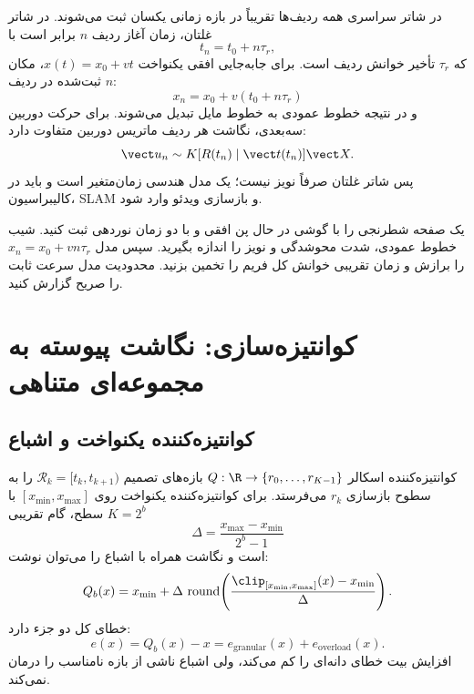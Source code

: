در شاتر سراسری همه ردیف‌ها تقریباً در بازه زمانی یکسان ثبت می‌شوند. در شاتر غلتان، زمان آغاز
ردیف \(n\) برابر است با
\begin{equation}
t_n=t_0+n\tau_r,
\end{equation}
که \(\tau_r\) تأخیر خوانش ردیف است. برای جابه‌جایی افقی یکنواخت \(x(t)=x_0+vt\)، مکان ثبت‌شده
در ردیف \(n\):
\begin{equation}
x_n=x_0+v(t_0+n\tau_r)
\end{equation}
و در نتیجه خطوط عمودی به خطوط مایل تبدیل می‌شوند. برای حرکت دوربین سه‌بعدی، نگاشت هر ردیف
ماتریس دوربین متفاوت دارد:
\begin{equation}
\vect u_n\sim K[R(t_n)\mid\vect t(t_n)]\vect X.
\end{equation}
پس شاتر غلتان صرفاً نویز نیست؛ یک مدل هندسی زمان‌متغیر است و باید در کالیبراسیون، SLAM و بازسازی
ویدئو وارد شود.

\begin{researchbox}
یک صفحه شطرنجی را با گوشی در حال پن افقی و با دو زمان نوردهی ثبت کنید. شیب خطوط عمودی، شدت
محوشدگی و نویز را اندازه بگیرید. سپس مدل \(x_n=x_0+vn\tau_r\) را برازش و زمان تقریبی خوانش کل
فریم را تخمین بزنید. محدودیت مدل سرعت ثابت را صریح گزارش کنید.
\end{researchbox}

\section{کوانتیزه‌سازی: نگاشت پیوسته به مجموعه‌ای متناهی}

\subsection{کوانتیزه‌کننده یکنواخت و اشباع}

کوانتیزه‌کننده اسکالر \(Q:\R\to\{r_0,\dots,r_{K-1}\}\) بازه‌های تصمیم
\(\mathcal R_k=[t_k,t_{k+1})\) را به سطوح بازسازی \(r_k\) می‌فرستد. برای کوانتیزه‌کننده یکنواخت
روی \([x_{\min},x_{\max}]\) با \(K=2^b\) سطح، گام تقریبی
\begin{equation}
\Delta=\frac{x_{\max}-x_{\min}}{2^b-1}
\end{equation}
است و نگاشت همراه با اشباع را می‌توان نوشت:
\begin{equation}
Q_b(x)=x_{\min}+\Delta\,
\operatorname{round}\!\left(
\frac{\clip_{[x_{\min},x_{\max}]}(x)-x_{\min}}{\Delta}
\right).
\end{equation}
خطای کل دو جزء دارد:
\begin{equation}
e(x)=Q_b(x)-x=e_{\mathrm{granular}}(x)+e_{\mathrm{overload}}(x).
\end{equation}
افزایش بیت خطای دانه‌ای را کم می‌کند، ولی اشباع ناشی از بازه نامناسب را درمان نمی‌کند.

